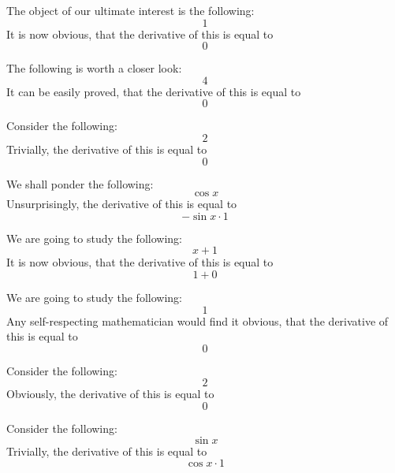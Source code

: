 \documentclass{article}
\begin{document}
The object of our ultimate interest is the following:
\begin{equation}
1 
\end{equation}
It is now obvious, that the derivative of this is equal to
\begin{equation}
0 
\end{equation}

The following is worth a closer look:
\begin{equation}
4 
\end{equation}
It can be easily proved, that the derivative of this is equal to
\begin{equation}
0 
\end{equation}

Consider the following:
\begin{equation}
2 
\end{equation}
Trivially, the derivative of this is equal to
\begin{equation}
0 
\end{equation}

We shall ponder the following:
\begin{equation}
\cos x 
\end{equation}
Unsurprisingly, the derivative of this is equal to
\begin{equation}
-\sin x \cdot 1 
\end{equation}

We are going to study the following:
\begin{equation}
x + 1 
\end{equation}
It is now obvious, that the derivative of this is equal to
\begin{equation}
1 + 0 
\end{equation}

We are going to study the following:
\begin{equation}
1 
\end{equation}
Any self-respecting mathematician would find it obvious, that the derivative of this is equal to
\begin{equation}
0 
\end{equation}

Consider the following:
\begin{equation}
2 
\end{equation}
Obviously, the derivative of this is equal to
\begin{equation}
0 
\end{equation}

Consider the following:
\begin{equation}
\sin x 
\end{equation}
Trivially, the derivative of this is equal to
\begin{equation}
\cos x \cdot 1 
\end{equation}
\end{document}

